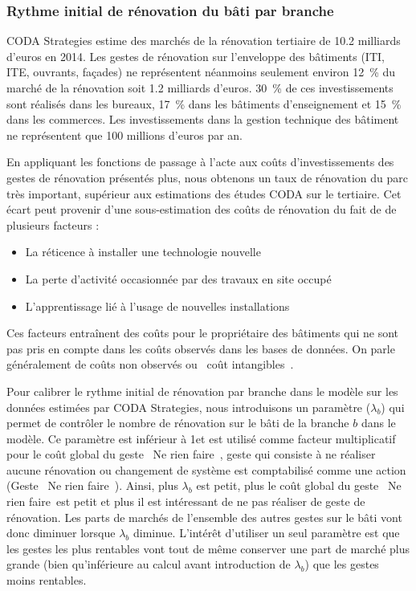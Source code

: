 \documentclass[10.5pt,a4paper]{article}
\begin{document}
{\subsubsection{Rythme initial de rénovation du bâti par branche}

CODA Strategies estime des marchés de la rénovation tertiaire de 10.2 milliards d'euros en 2014. Les gestes de rénovation sur l'enveloppe des bâtiments (ITI, ITE, ouvrants, façades) ne représentent néanmoins seulement environ 12~\% du marché de la rénovation soit 1.2 milliards d'euros. 30~\% de ces investissements sont réalisés dans les bureaux, 17~\% dans les bâtiments d'enseignement et 15~\% dans les commerces.  Les investissements dans la gestion technique des bâtiment ne représentent que 100 millions d'euros par an. 

En appliquant les fonctions de passage à l'acte aux coûts d'investissements des gestes de rénovation présentés plus, nous obtenons un taux de rénovation du parc très important, supérieur aux estimations des études CODA sur le tertiaire. Cet écart peut provenir d'une sous-estimation des coûts de rénovation du fait de de plusieurs facteurs :  

\begin{itemize}
\item La réticence à installer une technologie nouvelle 
\item La perte d’activité occasionnée par des travaux en site occupé
\item L’apprentissage lié à l’usage de nouvelles installations
\end{itemize}

Ces facteurs entraînent des coûts pour le propriétaire des bâtiments qui ne sont pas pris en compte dans les coûts observés dans les bases de données. On parle généralement de coûts non observés ou \og~coût intangibles~\fg.  

Pour calibrer le rythme initial de rénovation par branche dans le modèle sur les données estimées par CODA Strategies, nous introduisons un paramètre ($\lambda_b$) qui permet de contrôler le nombre de rénovation sur le bâti de la branche $b$ dans le modèle. Ce paramètre est inférieur à 1et est utilisé comme facteur multiplicatif pour le coût global du geste \og~Ne rien faire~\fg, geste qui consiste à ne réaliser aucune rénovation ou changement de système est comptabilisé comme une action (Geste \og~Ne rien faire~\fg). Ainsi, plus $\lambda_b$ est petit, plus le coût global du geste \og~Ne rien faire~\fg est petit et plus il est intéressant de ne pas réaliser de geste de rénovation. Les parts de marchés de l'ensemble des autres gestes sur le bâti vont donc diminuer lorsque $\lambda_b$ diminue. L'intérêt d'utiliser un seul paramètre est que les gestes les plus rentables vont tout de même conserver une part de marché plus grande (bien qu'inférieure au calcul avant introduction de $\lambda_b$) que les gestes moins rentables.  

}
\end{document}
